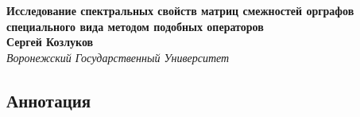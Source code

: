 \documentclass[12pt]{article}
\begin{document}
 

\begin{center}
    \textbf{Исследование спектральных свойств матриц
смежностей орграфов специального вида
методом подобных операторов}\\[3mm]
    \textbf{Сергей Козлуков}\\[2mm]
    \emph{Воронежский Государственный Университет}\\[2mm]
\end{center}

\subsection*{Аннотация}



\end{document}
